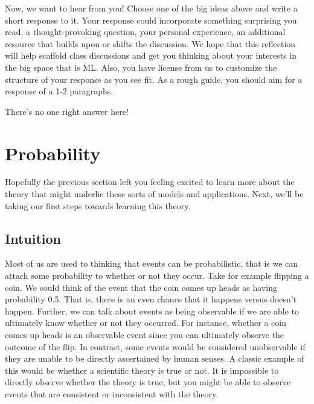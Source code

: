 \documentclass[assignment01_Solutions]{subfiles}
\begin{document}
\begin{exercise}
Now, we want to hear from you!  
Choose one of the big ideas above and write a short response to it.  Your response could incorporate something surprising you read, a thought-provoking question, your personal experience, an additional resource that builds upon or shifts the discussion.  We hope that this reflection will help scaffold class discussions and get you thinking about your interests in the big space that is ML.  Also, you have license from us to customize the structure of your response as you see fit.  As a rough guide, you should aim for a response of a 1-2 paragraphs.

\begin{boxedsolution}
There's no one right answer here!
\end{boxedsolution}
\end{exercise}

\section{Probability}

Hopefully the previous section left you feeling excited to learn more about the theory that might underlie these sorts of models and applications.  Next, we'll be taking our first steps towards learning this theory.

\subsection{Intuition}
Most of us are used to thinking that events can be probabilistic, that is we can attach some probability to whether or not they occur.  Take for example flipping a coin.  We could think of the event that the coin comes up heads as having probability 0.5.  That is, there is an even chance that it happens versus doesn’t happen.  Further, we can talk about events as being observable if we are able to ultimately know whether or not they occurred.  For instance, whether a coin comes up heads is an observable event since you can ultimately observe the outcome of the flip.  In contrast, some events would be considered unobservable if they are unable to be directly ascertained by human senses.  A classic example of this would be whether a scientific theory is true or not.  It is impossible to directly observe whether the theory is true, but you might be able to observe events that are consistent or inconsistent with the theory.
\end{document}
